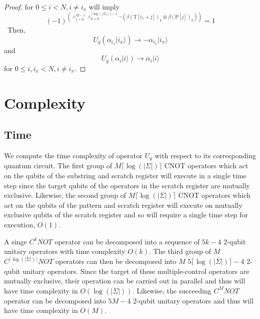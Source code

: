 \begin{proof}
for $0 \leq i < N, i \neq i_{x}$ will imply
\begin{equation}
(-1)^{\left(\wedge_{j=0}^{M-1} \wedge_{k=0}^{\lceil \log(\vert\Sigma\vert) \rceil-1} \neg\left( \beta(\text{T}[i_{x}+j])_k \oplus \beta(\text{P}[j])_{k} \right) \right)} = 1
\end{equation}\
Then,
\begin{equation*}
U_{g} \left(\alpha_{i_{x}}\vert i_{x} \rangle \right) \rightarrow -\alpha_{i_{x}}\vert i_{x} \rangle
\end{equation*}
and
\begin{equation*}
U_{g} \left(\alpha_{i}\vert i \rangle \right) \rightarrow \alpha_{i}\vert i \rangle
\end{equation*}
for $0 \leq i, i_{x} < N, i \neq i_{x}$.
\end{proof}



\section{Complexity}
\subsection{Time}
We compute the time complexity of operator $U_{g}$ with respect to its corresponding quantum circuit. The first group of $M\lceil\log(\vert\Sigma\vert)\rceil$ CNOT operators which act on the qubits of the substring and scratch register will execute in a single time step since the target qubits of the operators in the scratch register are mutually exclusive. Likewise, the second group of $M\lceil\log(\vert\Sigma\vert)\rceil$ CNOT operators which act on the qubits of the pattern and scratch register will execute on mutually exclusive qubits of the scratch register and so will require a single time step for execution, $O(1)$.

A singe $C^{k}NOT$ operator can be decomposed into a sequence of $5k-4$ 2-qubit unitary operators \cite{Chuang2000} with time complexity $O\left(k\right)$. The third group of $M$ $C^{\lceil\log(\vert\Sigma\vert)\rceil}NOT$ operators can then be decomposed into $M$ $5\lceil\log(\vert\Sigma\vert)\rceil - 4$ 2-qubit unitary operators. Since the target of these multiple-control operators are mutually exclusive, their operation can be carried out in parallel and thus will have time complexity in $O(\log(\vert\Sigma\vert))$. Likewise, the succeeding $C^{M}NOT$ operator can be decomposed into $5M - 4$ 2-qubit unitary operators and thus will have time complexity in $O(M)$.

